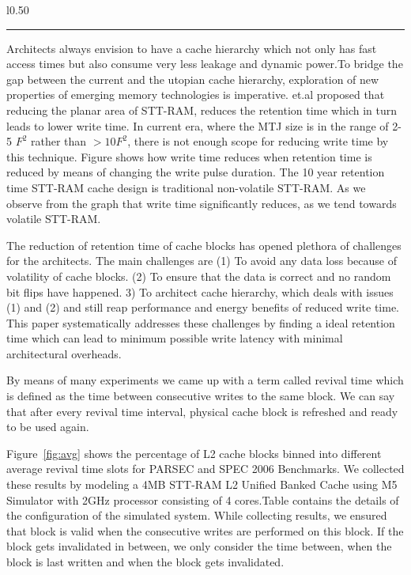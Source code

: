\begin{wrapfigure}{l}{0.50\textwidth}
\centering
 \hrule
 \caption{\label{fig:avg} \scriptsize \bf Percentage of L2 Cache Blocks with different average inter-write times}
\end{wrapfigure}




Architects always envision to have a cache hierarchy which not only has fast access times but also consume very less leakage and dynamic power.To bridge the gap between the current and the utopian cache hierarchy,  exploration of new properties of emerging memory technologies is imperative. \cite{sudhanva} et.al proposed that reducing the planar area of STT-RAM, reduces the retention time which in turn leads to lower write time.  In current era, where the MTJ size is in the range of 2-5 $F^2$ rather than $>10F^2$, there is not enough scope for reducing write time by this technique. Figure %
shows how write time reduces when retention time is reduced by means of changing the write pulse duration. The 10 year retention time STT-RAM cache design is traditional non-volatile STT-RAM. As we observe from the graph that write time significantly reduces, as we tend towards volatile STT-RAM.  %

The reduction of retention time of cache blocks has opened plethora of challenges for the architects. The main challenges are (1) To avoid any data loss because of volatility of cache blocks. (2) To ensure that the data is correct and no random bit flips have happened. 3) To architect cache hierarchy, which deals with issues (1) and (2) and still reap performance and energy benefits of reduced write time. This paper systematically addresses these challenges by finding a ideal retention time which can lead to minimum possible write latency with minimal architectural overheads.

By means of many experiments we came up with a term called revival time which is defined as  the time between consecutive writes to the same block. We can say that after every revival time interval, physical cache block is refreshed and ready to be used again.

Figure~\ref{fig:avg}  shows the percentage of L2 cache blocks binned into different average revival time slots for PARSEC and SPEC 2006 Benchmarks. We collected these results by modeling a 4MB STT-RAM L2 Unified Banked Cache using M5 Simulator with 2GHz processor consisting of 4 cores.Table contains the details of the configuration of the simulated system. While collecting results, we ensured that block is valid when the consecutive writes are performed on this block. If the block gets invalidated in between, we only consider the time between, when the block is last written and when the block gets invalidated.

